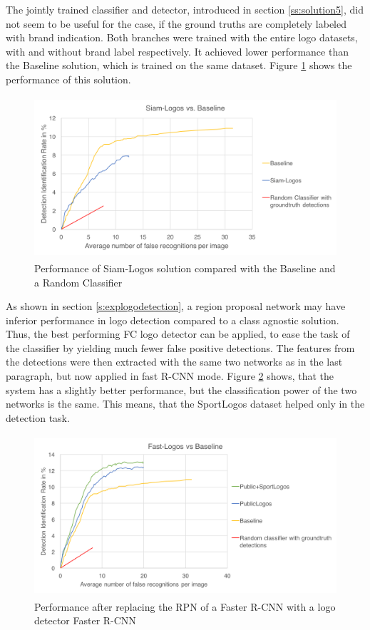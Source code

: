 The jointly trained classifier and detector, introduced in section \ref{ss:solution5}, did not seem to be useful for the case, if the ground truths are completely labeled with brand indication. Both branches were trained with the entire logo datasets, with and without brand label respectively. It achieved lower performance than the Baseline solution, which is trained on the same dataset. Figure \ref{f:sol5} shows the performance of this solution.
\begin{figure}
  \centering
  \includegraphics[height=60mm]{images/mt/sol5.png}
  \caption{Performance of Siam-Logos solution compared with the Baseline and a Random Classifier}
  \label{f:sol5}
\end{figure}
 As shown in section \ref{s:explogodetection}, a region proposal network may have inferior performance in logo detection compared to a class agnostic solution. Thus, the best performing FC logo detector can be applied, to ease the task of the classifier by yielding much fewer false positive detections. The features from the detections were then extracted with the same two networks as in the last paragraph, but now applied in fast R-CNN mode. Figure \ref{f:sol3} shows, that the system has a slightly better performance, but the classification power of the two networks is the same. This means, that the SportLogos dataset helped only in the detection task.
 \begin{figure}
  \centering
  \includegraphics[height=60mm]{images/mt/sol3.png}
  \caption{Performance after replacing the RPN of a Faster R-CNN with a logo detector Faster R-CNN}
  \label{f:sol3}
\end{figure}


